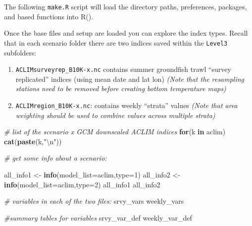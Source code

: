 \documentclass[
]{article}
\newenvironment{Shaded}{\begin{snugshade}}{\end{snugshade}}
\newcommand{\CharTok}[1]{\textcolor[rgb]{0.31,0.60,0.02}{#1}}
\newcommand{\CommentTok}[1]{\textcolor[rgb]{0.56,0.35,0.01}{\textit{#1}}}
\newcommand{\ControlFlowTok}[1]{\textcolor[rgb]{0.13,0.29,0.53}{\textbf{#1}}}
\newcommand{\DataTypeTok}[1]{\textcolor[rgb]{0.13,0.29,0.53}{#1}}
\newcommand{\DecValTok}[1]{\textcolor[rgb]{0.00,0.00,0.81}{#1}}
\newcommand{\KeywordTok}[1]{\textcolor[rgb]{0.13,0.29,0.53}{\textbf{#1}}}
\newcommand{\NormalTok}[1]{#1}
\newcommand{\StringTok}[1]{\textcolor[rgb]{0.31,0.60,0.02}{#1}}
\providecommand{\tightlist}{%
  \setlength{\itemsep}{0pt}\setlength{\parskip}{0pt}}
\begin{document}
The following \texttt{make.R} script will load the directory paths,
preferences, packages, and based functions into R().

\begin{Shaded}
\end{Shaded}

Once the base files and setup are loaded you can explore the index
types. Recall that in each scenario folder there are two indices saved
within the \texttt{Level3} subfolders:

\begin{enumerate}
\def\labelenumi{\arabic{enumi})}
\tightlist
\item
  \texttt{ACLIMsurveyrep\_B10K-x.nc} contains summer groundfish trawl
  ``survey replicated'' indices (using mean date and lat lon)
  \emph{(Note that the resampling stations need to be removed before
  creating bottom temperature maps)}\\
\item
  \texttt{ACLIMregion\_B10K-x.nc}: contains weekly ``strata'' values
  \emph{(Note that area weighting should be used to combine values
  across multiple strata)}
\end{enumerate}

\begin{Shaded}
\begin{Highlighting}[]
    \CommentTok{# list of the scenario x GCM downscaled ACLIM indices}
    \ControlFlowTok{for}\NormalTok{(k }\ControlFlowTok{in}\NormalTok{ aclim)}
     \KeywordTok{cat}\NormalTok{(}\KeywordTok{paste}\NormalTok{(k,}\StringTok{"}\CharTok{\textbackslash{}n}\StringTok{"}\NormalTok{))}
  
    \CommentTok{# get some info about a scenario:}
  
\NormalTok{    all_info1 <-}\StringTok{ }\KeywordTok{info}\NormalTok{(}\DataTypeTok{model_list=}\NormalTok{aclim,}\DataTypeTok{type=}\DecValTok{1}\NormalTok{)}
\NormalTok{    all_info2 <-}\StringTok{ }\KeywordTok{info}\NormalTok{(}\DataTypeTok{model_list=}\NormalTok{aclim,}\DataTypeTok{type=}\DecValTok{2}\NormalTok{)}
\NormalTok{    all_info1}
\NormalTok{    all_info2}
   
    \CommentTok{# variables in each of the two files:}
\NormalTok{    srvy_vars}
\NormalTok{    weekly_vars}
  
    \CommentTok{#summary tables for variables}
\NormalTok{    srvy_var_def}
\NormalTok{    weekly_var_def}
\end{Highlighting}
\end{Shaded}
\end{document}
